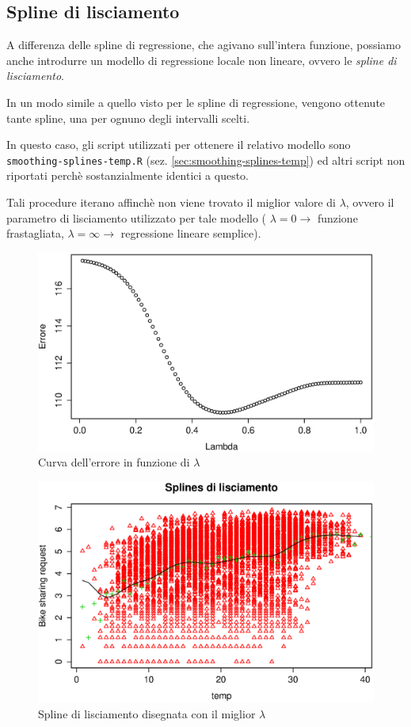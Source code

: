 
\subsection{Spline di lisciamento}\label{sec:smoothing-splines}
A differenza delle spline di regressione, che agivano sull'intera funzione,
possiamo anche introdurre un modello di regressione locale non lineare, ovvero
le \emph{spline di lisciamento}.

In un modo simile a quello visto per le spline di regressione, vengono
ottenute tante spline, una per ognuno degli intervalli scelti.

In questo caso, gli script utilizzati per ottenere il relativo modello sono
\texttt{smoothing-splines-temp.R} (sez. \ref{sec:smoothing-splines-temp}) ed
altri script non riportati perchè sostanzialmente identici a questo.

Tali procedure iterano affinchè non viene trovato il miglior valore di
$ \lambda $, ovvero il parametro di lisciamento utilizzato per tale modello (
$ \lambda = 0 \rightarrow $ funzione frastagliata,
$ \lambda = \infty \rightarrow $ regressione lineare semplice).

\begin{figure}[H]
  \centering
  \includegraphics[width=.7\columnwidth]{images/non-linear/smoothing-splines-error-lambda.eps}
  \caption{Curva dell'errore in funzione di $ \lambda $}
  \label{fig:smoothing-optimal-lambda}
\end{figure}

\begin{figure}[H]
  \centering
  \includegraphics[width=.7\columnwidth]{images/non-linear/smoothing-spl-draw.eps}
  \caption{Spline di lisciamento disegnata con il miglior $ \lambda $}
  \label{fig:smoothing-spline-draw}
\end{figure}

